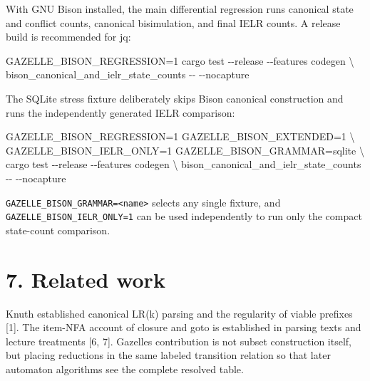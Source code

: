 \documentclass[
  10pt,
]{article}
\newenvironment{Shaded}{}{}
\newcommand{\AttributeTok}[1]{\textcolor[rgb]{0.49,0.56,0.16}{#1}}
\newcommand{\DataTypeTok}[1]{\textcolor[rgb]{0.56,0.13,0.00}{#1}}
\newcommand{\ExtensionTok}[1]{#1}
\newcommand{\NormalTok}[1]{#1}
\newcommand{\OperatorTok}[1]{\textcolor[rgb]{0.40,0.40,0.40}{#1}}
\newcommand{\VariableTok}[1]{\textcolor[rgb]{0.10,0.09,0.49}{#1}}
\begin{document}
With GNU Bison installed, the main differential regression runs
canonical state and conflict counts, canonical bisimulation, and final
IELR counts. A release build is recommended for jq:

\begin{Shaded}
\begin{Highlighting}[]
\VariableTok{GAZELLE\_BISON\_REGRESSION}\OperatorTok{=}\NormalTok{1 }\ExtensionTok{cargo}\NormalTok{ test }\AttributeTok{{-}{-}release} \AttributeTok{{-}{-}features}\NormalTok{ codegen }\DataTypeTok{\textbackslash{}}
\NormalTok{  bison\_canonical\_and\_ielr\_state\_counts }\AttributeTok{{-}{-}} \AttributeTok{{-}{-}nocapture}
\end{Highlighting}
\end{Shaded}

The SQLite stress fixture deliberately skips Bison canonical
construction and runs the independently generated IELR comparison:

\begin{Shaded}
\begin{Highlighting}[]
\VariableTok{GAZELLE\_BISON\_REGRESSION}\OperatorTok{=}\NormalTok{1 }\VariableTok{GAZELLE\_BISON\_EXTENDED}\OperatorTok{=}\NormalTok{1 }\DataTypeTok{\textbackslash{}}
\VariableTok{GAZELLE\_BISON\_IELR\_ONLY}\OperatorTok{=}\NormalTok{1 }\VariableTok{GAZELLE\_BISON\_GRAMMAR}\OperatorTok{=}\NormalTok{sqlite }\DataTypeTok{\textbackslash{}}
  \ExtensionTok{cargo}\NormalTok{ test }\AttributeTok{{-}{-}release} \AttributeTok{{-}{-}features}\NormalTok{ codegen }\DataTypeTok{\textbackslash{}}
\NormalTok{  bison\_canonical\_and\_ielr\_state\_counts }\AttributeTok{{-}{-}} \AttributeTok{{-}{-}nocapture}
\end{Highlighting}
\end{Shaded}

\texttt{GAZELLE\_BISON\_GRAMMAR=\textless{}name\textgreater{}} selects
any single fixture, and \texttt{GAZELLE\_BISON\_IELR\_ONLY=1} can be
used independently to run only the compact state-count comparison.

\hypertarget{7-related-work}{%
\section{7. Related work}\label{7-related-work}}

Knuth established canonical LR(k) parsing and the regularity of viable
prefixes {[}1{]}. The item-NFA account of closure and goto is
established in parsing texts and lecture treatments {[}6, 7{]}.
Gazelle\textquotesingle s contribution is not subset construction
itself, but placing reductions in the same labeled transition relation
so that later automaton algorithms see the complete resolved table.
\end{document}
